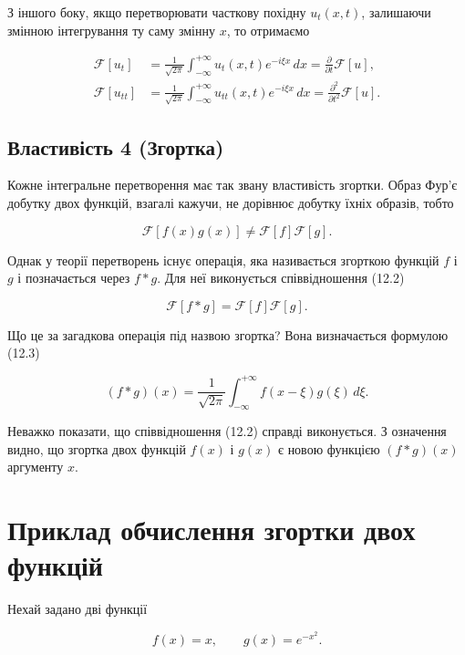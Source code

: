 \documentclass[
  ukrainian,
]{article}
\begin{document}
З іншого боку, якщо перетворювати часткову похідну \(u_t(x,t)\),
залишаючи змінною інтегрування ту саму змінну \(x\), то отримаємо

\[
\begin{aligned}
\mathcal{F}[u_t] &= \frac{1}{\sqrt{2\pi}} \int_{-\infty}^{+\infty} u_t(x,t)e^{-i\xi x}\,dx = \frac{\partial}{\partial t}\mathcal{F}[u], \\
\mathcal{F}[u_{tt}] &= \frac{1}{\sqrt{2\pi}} \int_{-\infty}^{+\infty} u_{tt}(x,t)e^{-i\xi x}\,dx = \frac{\partial^2}{\partial t^2}\mathcal{F}[u].
\end{aligned}
\]

\subsection{Властивість 4
(Згортка)}\label{ux432ux43bux430ux441ux442ux438ux432ux456ux441ux442ux44c-4-ux437ux433ux43eux440ux442ux43aux430}

Кожне інтегральне перетворення має так звану властивість згортки. Образ
Фур'є добутку двох функцій, взагалі кажучи, не дорівнює добутку їхніх
образів, тобто

\[
\mathcal{F}[f(x)g(x)] \neq \mathcal{F}[f]\mathcal{F}[g].
\]

Однак у теорії перетворень існує операція, яка називається згорткою
функцій \(f\) і \(g\) і позначається через \(f*g\). Для неї виконується
співвідношення (12.2)

\[
\mathcal{F}[f*g] = \mathcal{F}[f]\mathcal{F}[g].
\]

Що це за загадкова операція під назвою згортка? Вона визначається
формулою (12.3)

\[
(f*g)(x) = \frac{1}{\sqrt{2\pi}} \int_{-\infty}^{+\infty} f(x-\xi)g(\xi)\,d\xi.
\]

Неважко показати, що співвідношення (12.2) справді виконується. З
означення видно, що згортка двох функцій \(f(x)\) і \(g(x)\) є новою
функцією \((f*g)(x)\) аргументу \(x\).

\section{Приклад обчислення згортки двох
функцій}\label{ux43fux440ux438ux43aux43bux430ux434-ux43eux431ux447ux438ux441ux43bux435ux43dux43dux44f-ux437ux433ux43eux440ux442ux43aux438-ux434ux432ux43eux445-ux444ux443ux43dux43aux446ux456ux439}

Нехай задано дві функції

\[
f(x) = x, \qquad g(x) = e^{-x^2}.
\]
\end{document}
